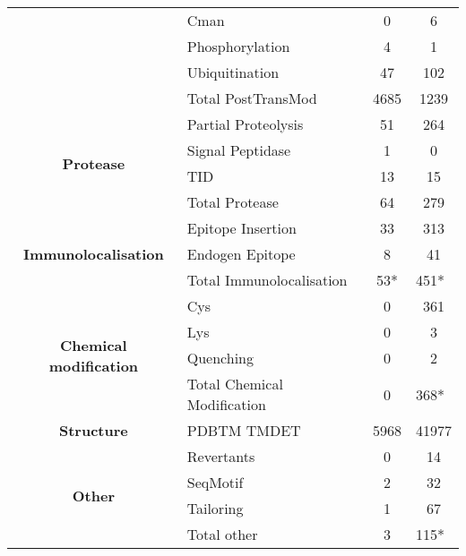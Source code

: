 \begin{table}[htbp]
{\begin{tabular}{cp{5em}cp{5em}}
\cmidrule{2-4}          & Cman  & 0     & \multicolumn{1}{c}{6} \\
\cmidrule{2-4}          & Phosphorylation & 4     & \multicolumn{1}{c}{1} \\
\cmidrule{2-4}          & Ubiquitination & 47    & \multicolumn{1}{c}{102} \\
\cmidrule{2-4}          & Total PostTransMod & 4685  & \multicolumn{1}{c}{1239} \\
    \midrule
    \multicolumn{1}{c}{\multirow{4}[8]{*}{\textbf{Protease}}} & Partial Proteolysis & 51    & \multicolumn{1}{c}{264} \\
\cmidrule{2-4}          & Signal Peptidase & 1     & \multicolumn{1}{c}{0} \\
\cmidrule{2-4}          & TID   & 13    & \multicolumn{1}{c}{15} \\
\cmidrule{2-4}          & Total Protease & 64    & \multicolumn{1}{c}{279} \\
    \midrule
    \multicolumn{1}{c}{\multirow{3}[6]{*}{\textbf{Immunolocalisation}}} & Epitope Insertion & 33    & \multicolumn{1}{c}{313} \\
\cmidrule{2-4}          & Endogen Epitope & 8     & \multicolumn{1}{c}{41} \\
\cmidrule{2-4}          & Total Immunolocalisation & \multicolumn{1}{p{5em}}{53*} & 451* \\
    \midrule
    \multicolumn{1}{c}{\multirow{4}[8]{*}{\textbf{Chemical modification}}} & Cys   & 0     & \multicolumn{1}{c}{361} \\
\cmidrule{2-4}          & Lys   & 0     & \multicolumn{1}{c}{3} \\
\cmidrule{2-4}          & Quenching & 0     & \multicolumn{1}{c}{2} \\
\cmidrule{2-4}          & Total Chemical Modification & 0     & 368* \\
    \midrule
    \multicolumn{1}{p{5em}}{\textbf{Structure}} & PDBTM TMDET & 5968  & \multicolumn{1}{c}{41977} \\
    \midrule
    \multicolumn{1}{c}{\multirow{4}[8]{*}{\textbf{Other}}} & Revertants & 0     & \multicolumn{1}{c}{14} \\
\cmidrule{2-4}          & SeqMotif & 2     & \multicolumn{1}{c}{32} \\
\cmidrule{2-4}          & Tailoring & 1     & \multicolumn{1}{c}{67} \\
\cmidrule{2-4}          & Total other & 3     & 115* \\
    \bottomrule
    \end{tabular}%
    }
   \label{table:topdbevidence}

\end{table}%

